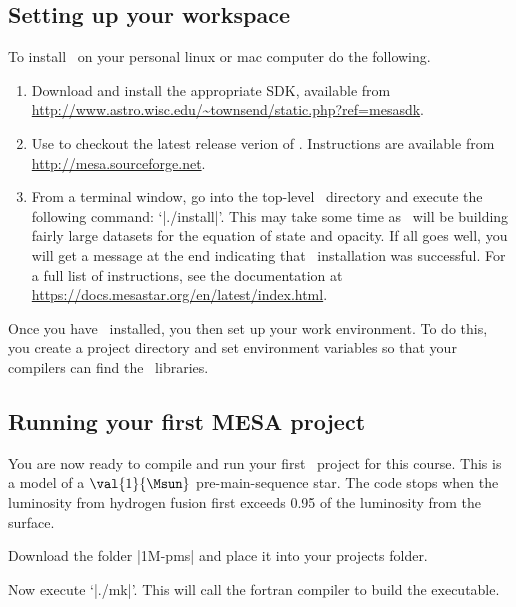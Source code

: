 
\DefineShortVerb{\|}

\begin{mesaproject}
\label{m.MESA-contraction}

\subsection{Setting up your workspace}

To install \mesa\ on your personal linux or mac computer do the following.
\begin{enumerate}
	\item Download and install the appropriate SDK, available from \url{http://www.astro.wisc.edu/~townsend/static.php?ref=mesasdk}. 
	\item Use  to checkout the latest release verion of \MESA. Instructions are available from \url{http://mesa.sourceforge.net}.
	\item From a terminal window, go into the top-level \mesa\ directory and execute the following command: `|./install|'.  This may take some time as \mesa\ will be building fairly large datasets for the equation of state and opacity.  If all goes well, you will get a message at the end indicating that \mesa\ installation was successful. For a full list of instructions, see the documentation at \url{https://docs.mesastar.org/en/latest/index.html}.
\end{enumerate}

Once you have \mesa\ installed, you then set up your work environment. To do this, you create a project directory and set environment variables so that your  compilers can find the \mesa\ libraries.

\subsection{Running your first MESA project}

You are now ready to compile and run your first \mesa\ project for this course. This is a model of a $\val{1}{\Msun}$ pre-main-sequence star. The code stops when the luminosity from hydrogen fusion first exceeds 0.95 of the luminosity from the surface. 

Download the folder |1M-pms| and place it into your projects folder.

Now execute `|./mk|'. This will call the fortran compiler to build the executable. 


\end{mesaproject}
